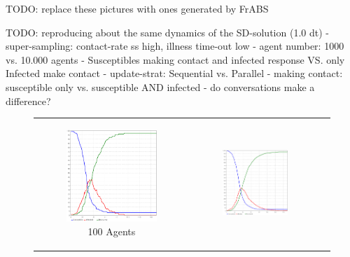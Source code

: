 TODO: replace these pictures with ones generated by FrABS

TODO: reproducing about the same dynamics of the SD-solution (1.0 dt)
	- super-sampling: 	contact-rate ss high, illness time-out low 
	- agent number:		1000 vs. 10.000 agents
	- Susceptibles making contact and infected response VS. only Infected make contact
	- update-strat:		Sequential vs. Parallel
	- making contact: susceptible only vs. susceptible AND infected
	- do conversations make a difference?

\begin{figure}
\begin{center}

	\begin{tabular}{c c c}
		\begin{subfigure}[b]{0.3\textwidth}
			\centering
			\includegraphics[width=.7\textwidth, angle=0]{./../shared/fig/SIR_ABS_ANYLOGIC_100Agents.png}
			\caption{100 Agents}
			\label{fig:pd_seq}
		\end{subfigure}
    	&
		\begin{subfigure}[b]{0.3\textwidth}
			\centering
			\includegraphics[width=.7\textwidth, angle=0]{./../shared/fig/SIR_ABS_ANYLOGIC_1000Agents.png}

\end{subfigure}
\end{tabular}
\end{center}
\end{figure}
